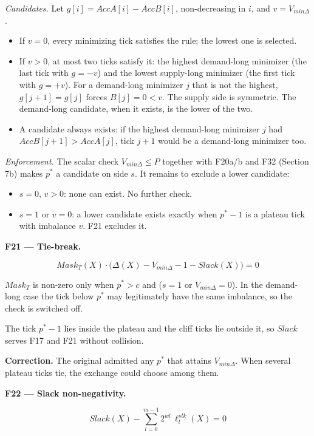 \emph{Candidates.} Let \(g[i] = AccA[i] - AccB[i]\), non-decreasing in \(i\), and \(v = V_{min\Delta}\).

\begin{itemize}
\item
  If \(v = 0\), every minimizing tick satisfies the rule; the lowest one is selected.
\item
  If \(v > 0\), at most two ticks satisfy it: the highest demand-long minimizer (the last tick with \(g = -v\)) and the lowest supply-long minimizer (the first tick with \(g = +v\)). For a demand-long minimizer \(j\) that is not the highest, \(g[j+1] = g[j]\) forces \(B[j] = 0 < v\). The supply side is symmetric. The demand-long candidate, when it exists, is the lower of the two.
\item
  A candidate always exists: if the highest demand-long minimizer \(j\) had \(AccB[j+1] > AccA[j]\), tick \(j+1\) would be a demand-long minimizer too.
\end{itemize}

\emph{Enforcement.} The scalar check \(V_{min\Delta} \le P\) together with F20a/b and F32 (Section 7b) makes \(p^*\) a candidate on side \(s\). It remains to exclude a lower candidate:

\begin{itemize}
\item
  \(s = 0\), \(v > 0\): none can exist. No further check.
\item
  \(s = 1\) or \(v = 0\): a lower candidate exists exactly when \(p^* - 1\) is a plateau tick with imbalance \(v\). F21 excludes it.
\end{itemize}

\textbf{F21 --- Tie-break.}

\[Mask_T(X) \cdot \big(\Delta(X) - V_{min\Delta} - 1 - Slack(X)\big) = 0\]

\(Mask_T\) is non-zero only when \(p^* > c\) and (\(s = 1\) or \(V_{min\Delta} = 0\)). In the demand-long case the tick below \(p^*\) may legitimately have the same imbalance, so the check is switched off.

The tick \(p^*-1\) lies inside the plateau and the cliff ticks lie outside it, so \(Slack\) serves F17 and F21 without collision.

\textbf{Correction.} The original admitted any \(p^*\) that attains \(V_{min\Delta}\). When several plateau ticks tie, the exchange could choose among them.

\textbf{F22 --- Slack non-negativity.}

\[Slack(X) - \sum_{l=0}^{m-1} 2^{wl}\, \ell^{slk}_l(X) = 0\]

